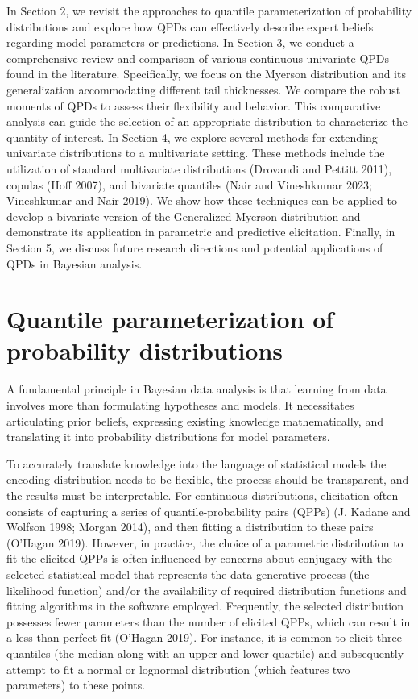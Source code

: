 \documentclass[
]{interact}
\begin{document}
In Section 2, we revisit the approaches to quantile parameterization of
probability distributions and explore how QPDs can effectively describe
expert beliefs regarding model parameters or predictions. In Section 3,
we conduct a comprehensive review and comparison of various continuous
univariate QPDs found in the literature. Specifically, we focus on the
Myerson distribution and its generalization accommodating different tail
thicknesses. We compare the robust moments of QPDs to assess their
flexibility and behavior. This comparative analysis can guide the
selection of an appropriate distribution to characterize the quantity of
interest. In Section 4, we explore several methods for extending
univariate distributions to a multivariate setting. These methods
include the utilization of standard multivariate distributions (Drovandi
and Pettitt 2011), copulas (Hoff 2007), and bivariate quantiles (Nair
and Vineshkumar 2023; Vineshkumar and Nair 2019). We show how these
techniques can be applied to develop a bivariate version of the
Generalized Myerson distribution and demonstrate its application in
parametric and predictive elicitation. Finally, in Section 5, we discuss
future research directions and potential applications of QPDs in
Bayesian analysis.

\section{Quantile parameterization of probability
distributions}\label{quantile-parameterization-of-probability-distributions}

A fundamental principle in Bayesian data analysis is that learning from
data involves more than formulating hypotheses and models. It
necessitates articulating prior beliefs, expressing existing knowledge
mathematically, and translating it into probability distributions for
model parameters.

To accurately translate knowledge into the language of statistical
models the encoding distribution needs to be flexible, the process
should be transparent, and the results must be interpretable. For
continuous distributions, elicitation often consists of capturing a
series of quantile-probability pairs (QPPs) (J. Kadane and Wolfson 1998;
Morgan 2014), and then fitting a distribution to these pairs (O'Hagan
2019). However, in practice, the choice of a parametric distribution to
fit the elicited QPPs is often influenced by concerns about conjugacy
with the selected statistical model that represents the data-generative
process (the likelihood function) and/or the availability of required
distribution functions and fitting algorithms in the software employed.
Frequently, the selected distribution possesses fewer parameters than
the number of elicited QPPs, which can result in a less-than-perfect fit
(O'Hagan 2019). For instance, it is common to elicit three quantiles
(the median along with an upper and lower quartile) and subsequently
attempt to fit a normal or lognormal distribution (which features two
parameters) to these points.
\end{document}
